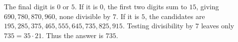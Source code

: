 The final digit is $0$ or $5$. If it is $0$, the first two digits sum to $15$, giving $690,780,870,960$, none divisible by $7$. If it is $5$, the candidates are $195,285,375,465,555,645,735,825,915$. Testing divisibility by $7$ leaves only $735=35\cdot21$. Thus the answer is $\boxed{735}$.
